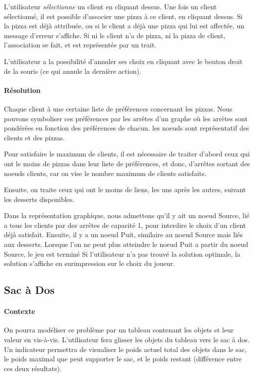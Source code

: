 			L'utilisateur \emph{sélectionne} un client en cliquant dessus.
            Une fois un client sélectionné, il est possible
            d'associer une pizza à ce client, en cliquant dessus.
            Si la pizza est déjà attribuée, ou si le client a déjà
            une pizza qui lui est affectée, un message d'erreur s'affiche.
            Si ni le client n'a de pizza, ni la pizza de client, l'association
            se fait, et est représentée par un trait.

			L'utilisateur a la possibilité d'annuler ses choix en cliquant avec le bouton
			 droit de la souris (ce qui annule la dernière action).
		\paragraph{Résolution} %
			Chaque client à une certaine liste de préférences concernant les pizzas.
			Nous pouvons symboliser ces préférences par les arrêtes d'un graphe où
            les arrètes sont pondérées en fonction des préférences de chacun.
			les noeuds sont représentatif des clients et des pizzas.

			Pour satisfaire le maximum de clients, il est nécessaire de traiter d'abord
			ceux qui ont le moins de pizzas dans leur liste de préférences, et donc,
			d'arrêtes sortant des noeuds clients, car on vise le nombre maximum de clients
			satisfaits.

			Ensuite, on traite ceux qui ont le moins de liens, les uns après les autres,
			suivant les desserts disponibles.

			Dans la représentation graphique, nous admettons qu'il y ait un noeud Source,
			 lié a tous les clients par des arrêtes de capacité 1, pour interdire le
			 choix d'un client déjà satisfait.
			Ensuite, il y a un noeud Puit, similaire au noeud Source mais liés aux
			 desserts.
			Lorsque l'on ne peut plus atteindre le noeud Puit a partir du noeud Source,
			 le jeu est terminé
			Si l'utilisateur n'a pas trouvé la solution optimale, la solution s'affiche
			 en surimpression sur le choix du joueur.



    \subsection{Sac à Dos}
        \paragraph{Contexte}
        On pourra modéliser ce problème par un tableau contenant les objets et leur
        valeur en vis-à-vis. L'utilisateur fera glisser les objets du tableau vers
        le sac à dos. Un indicateur permettra de visualiser le poids actuel total
        des objets dans le sac, le poids maximal que peut supporter le sac, et le
        poids restant (différence entre ces deux résultats).

